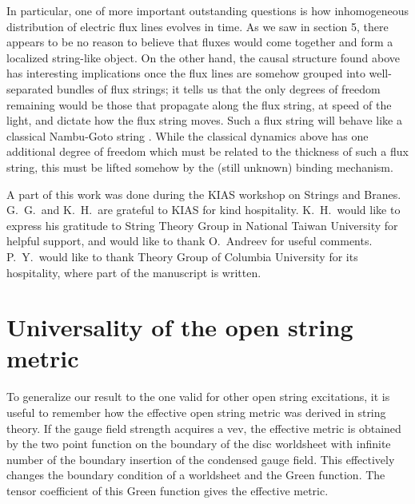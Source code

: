 \documentclass[a4paper,12pt]{article}
\begin{document}
In particular, one of more important outstanding questions is how
inhomogeneous distribution of electric flux lines evolves in time. As we
saw in section 5, there appears to be no reason to believe that fluxes
would come together and form a localized string-like object. On the
other hand, the causal structure found above has interesting
implications once the flux lines are somehow grouped into well-separated
bundles of flux strings; it tells us that the only degrees of freedom
remaining would be those that propagate along the flux string, at speed
of the light, and dictate how the flux string moves. Such a flux string
will behave like a classical Nambu-Goto string \cite{fluid}. While the
classical dynamics above has one additional degree of freedom which
must be related to the thickness of such a flux string, this must be lifted
somehow by the (still unknown) binding mechanism. 

\vskip 1cm

\noindent
{}
\vskip 0.5cm \noindent
A part of this work was done during the KIAS workshop on Strings
and Branes.  G.\ G.\ and K.\ H.\ are grateful to KIAS for kind
hospitality. K.\ H.\ would like to express his gratitude to 
String Theory Group in National Taiwan University for helpful 
support, and would like to thank O.\ Andreev for useful
comments. P.\ Y.\ would like to thank Theory Group of Columbia
University for its hospitality, where part of the manuscript is
written. 


\vskip 1cm
\appendix

\section{Universality of the open string metric}

To generalize our 
result to the one valid for other open string excitations, 
it is useful to remember  how the effective
open string metric \coordHE{} was derived in string
theory. If the gauge field strength acquires a vev, the effective metric
is obtained by the two point function on the boundary of the disc
worldsheet with 
infinite number of the boundary insertion of the condensed gauge
field. This effectively changes the boundary condition of a worldsheet
and the Green function. The tensor coefficient of this 
Green function \coordHE{} gives the effective metric.  
\end{document}
